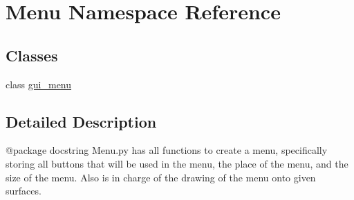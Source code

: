 \hypertarget{namespace_menu}{}\section{Menu Namespace Reference}
\label{namespace_menu}
\subsection*{Classes}
\begin{DoxyCompactItemize}
\item 
class \hyperlink{class_menu_1_1gui__menu}{gui\+\_\+menu}
\end{DoxyCompactItemize}


\subsection{Detailed Description}
\begin{DoxyVerb}@package docstring
   Menu.py has all functions to create a menu, specifically storing all buttons that will be used in the menu, the place of the menu, and the size of the menu.
   Also is in charge of the drawing of the menu onto given surfaces.
\end{DoxyVerb}
 
